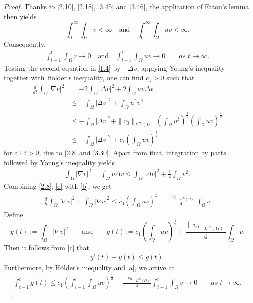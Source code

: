 \documentclass[12pt]{article}
\theoremstyle{plain}
\theoremstyle{definition}
\numberwithin{equation}{section}
\begin{document}
\begin{proof}
Thanks to \eqref{2.10},
\eqref{2.18}, \eqref{3.45} and
\eqref{3.46}, the application of  Fatou's lemma  then yields
$$\int_0^{\infty}\int_{\Omega}v<\infty \quad\text{and}\quad \int_0^{\infty}\int_{\Omega}uv<\infty.$$
Consequently,
\begin{align}\label{a}
    \int_{t-1}^{t}\int_{\Omega}v\rightarrow 0\quad\text{and}\quad\int_{t-1}^{t}\int_{\Omega}uv\rightarrow 0\qquad as\; t\to \infty.
\end{align}
Testing the second equation in \eqref{1.4} by $-\Delta v$, applying Young’s inequality together with H\"{o}lder's inequality, one can find $c_1>0$ such that
\begin{align}\label{e}
    \frac{d}{dt}\int_{\Omega}|\nabla v|^2&=-2\int_{\Omega}|\Delta v|^2+2\int_{\Omega}uv\Delta v\nonumber \\
    &\leq -\int_{\Omega}|\Delta v|^2+\int_{\Omega}u^2v^2\nonumber \\
    &\leq-\int_{\Omega}|\Delta v|^2+\|v_0\|_{L^{\infty}(\Omega)}\left(\int_{\Omega}u^3\right)^{\frac{1}{2}}\left(\int_{\Omega}uv\right)^{\frac{1}{2}}\nonumber \\
   &\leq -\int_{\Omega}|\Delta v|^2+c_1\left(\int_{\Omega}uv\right)^{\frac{1}{2}}
    \end{align}
for all $t>0$, due to \eqref{2.8} and \eqref{3.30}. Apart from that, integration by parts followed by Young’s inequality yields
\begin{align}\label{b}
    \int_{\Omega}|\nabla v|^2=\int_{\Omega}v\Delta v\leq \int_{\Omega}|\Delta v|^2+\frac{1}{4}\int_{\Omega}v^2.
\end{align}
 Combining \eqref{2.8}, \eqref{e} with \eqref{b}, we get
\begin{align}\label{c}
\frac{d}{dt}\int_{\Omega}|\nabla v|^2+\int_{\Omega}|\nabla v|^2\leq c_1\left(\int_{\Omega}uv\right)^{\frac{1}{2}}+\frac{\|v_0\|_{L^{\infty}(\Omega)}}{4}\int_{\Omega}v.
\end{align}
 Define $$y(t):=\int_{\Omega}|\nabla v|^2\qquad \text{and}\qquad g(t):=c_1\left(\int_{\Omega}uv\right)^{\frac{1}{2}}+\frac{\|v_0\|_{L^{\infty}(\Omega)}}{4}\int_{\Omega}v.$$ Then it follows from \eqref{c} that
\begin{align*}
    y'(t)+y(t)\leq g(t).
\end{align*}
Furthermore, by H\"{o}lder's inequality and \eqref{a}, we arrive at
\begin{align}\label{d}
\int_{t-1}^{t}g(t)\leq c_1\left(\int_{t-1}^{t}\int_{\Omega}uv\right)^{\frac{1}{2}}+\frac{\|v_0\|_{L^{\infty}(\Omega)}}{4}\int_{t-1}^{t}\int_{\Omega}v\rightarrow 0\qquad as\; t\to \infty.

\end{align}
\end{proof}
\end{document}
